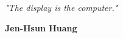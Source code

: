 \begin{epigrafe}
\vspace*{\fill}
\begin{flushright}
\textit{"The display is the computer."\\}
\vspace{\onelineskip}
{\bfseries Jen-Hsun Huang \par}
\end{flushright}
\end{epigrafe}
